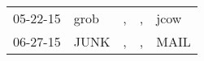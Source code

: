 \begin{supertabular}{p{0.07\textwidth}p{0.06\textwidth}p{0.02\textwidth}p{0.02\textwidth}p{0.06\textwidth}}
 05-22-15\textsuperscript{} &  grob\textsuperscript{} &  , &  , &  jcow\textsuperscript{} \\
 06-27-15\textsuperscript{} &  JUNK\textsuperscript{} &  , &  , &  MAIL\textsuperscript{} \\
\end{supertabular}
